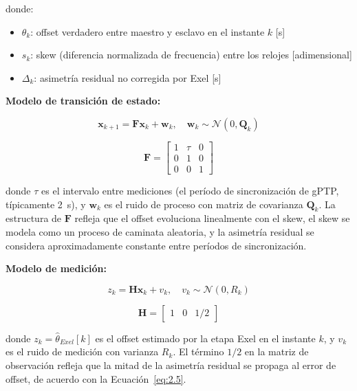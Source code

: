 donde:
\begin{itemize}
\item $\theta_k$: offset verdadero entre maestro y esclavo en el instante $k$ [s]
\item $s_k$: skew (diferencia normalizada de frecuencia) entre los relojes [adimensional]
\item $\Delta_k$: asimetría residual no corregida por Exel [s]
\end{itemize}

\textbf{Modelo de transición de estado:}

\begin{equation}
\mathbf{x}_{k+1} = \mathbf{F} \mathbf{x}_k + \mathbf{w}_k, \quad \mathbf{w}_k \sim \mathcal{N}(0, \mathbf{Q}_k)
\end{equation}

\begin{equation}
\mathbf{F} = \begin{bmatrix} 1 & \tau & 0 \\ 0 & 1 & 0 \\ 0 & 0 & 1 \end{bmatrix}
\end{equation}

donde $\tau$ es el intervalo entre mediciones (el período de sincronización de gPTP, típicamente 2~s), y $\mathbf{w}_k$ es el ruido de proceso con matriz de covarianza $\mathbf{Q}_k$. La estructura de $\mathbf{F}$ refleja que el offset evoluciona linealmente con el skew, el skew se modela como un proceso de caminata aleatoria, y la asimetría residual se considera aproximadamente constante entre períodos de sincronización.

\textbf{Modelo de medición:}

\begin{equation}
z_k = \mathbf{H} \mathbf{x}_k + v_k, \quad v_k \sim \mathcal{N}(0, R_k)
\end{equation}

\begin{equation}
\mathbf{H} = \begin{bmatrix} 1 & 0 & 1/2 \end{bmatrix}
\end{equation}

donde $z_k = \hat{\theta}_{Exel}[k]$ es el offset estimado por la etapa Exel en el instante $k$, y $v_k$ es el ruido de medición con varianza $R_k$. El término $1/2$ en la matriz de observación refleja que la mitad de la asimetría residual se propaga al error de offset, de acuerdo con la Ecuación~\ref{eq:2.5}.

